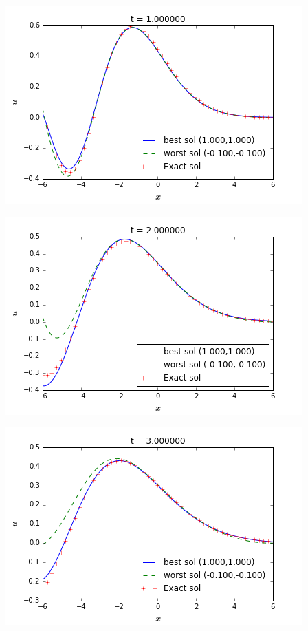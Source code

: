 \begingroup
\noindent
\begin{minipage}[t]{.5\linewidth}
  \includegraphics[scale=.375]{Fig1a.png}
\end{minipage}
\hfill
\begin{minipage}[t]{.5\linewidth}
	\includegraphics[scale=.375]{Fig1b.png}
\end{minipage}
\begin{minipage}[t]{.5\linewidth}
\includegraphics[scale=.375]{Fig1c.png}
\end{minipage}
